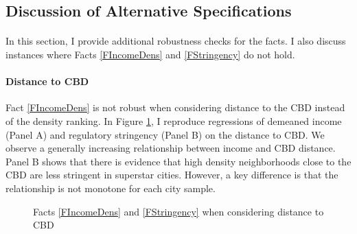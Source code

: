 \documentclass[12pt]{article}
\begin{document}
	
	
	
	\clearpage
	
	\subsection{Discussion of Alternative Specifications}\label{Appendix:Robustness}
	\paragraph*{}
	In this section, I provide additional robustness checks for the facts. I also discuss instances where Facts \ref{FIncomeDens} and \ref{FStringency} do not hold. 
	
	\paragraph*{Distance to CBD} Fact \ref{FIncomeDens} is not robust when considering distance to the CBD instead of the density ranking. In Figure \ref{figure:CBD_Facts}, I reproduce regressions of demeaned income (Panel A) and regulatory stringency (Panel B) on the distance to CBD. We observe a generally increasing relationship between income and CBD distance. Panel B shows that there is evidence that high density neighborhoods close to the CBD are less stringent in superstar cities. However, a key difference is that the relationship is not monotone for each city sample. 
	
	\begin{figure}[htbp!]
		\caption{Facts \ref{FIncomeDens} and \ref{FStringency} when considering distance to CBD}\label{figure:CBD_Facts}
		
	\end{figure}
	
\end{document}
